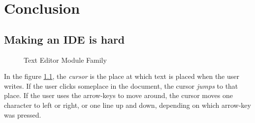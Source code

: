 \chapter{Conclusion}

\section{Making an IDE is hard}

\begin{figure}
  \centering
  
  \caption{Text Editor Module Family}
  \label{fig:extendedModuleFamily}
\end{figure}

In the figure \ref{fig:extendedModuleFamily}, the \textit{cursor} is the place
at which text is placed when the user writes. If the user clicks someplace in
the document, the cursor \textit{jumps} to that place. If the user uses the
arrow-keys to move around, the cursor moves one character to left or right, or
one line up and down, depending on which arrow-key was pressed.

